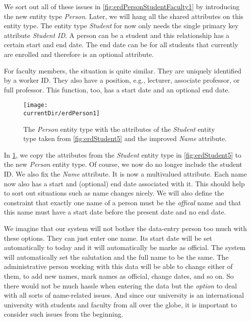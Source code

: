 We sort out all of these issues in \cref{fig:erdPersonStudentFaculty1} by introducing the new entity type \emph{Person}.
Later, we will hang all the shared attributes on this entity type.
The entity type \emph{Student} for now only needs the single primary key attribute \emph{Student ID}.
A person can be a student and this relationship has a certain start and end date.
The end date can be  for all students that currently are enrolled and therefore is an optional attribute.

For faculty members, the situation is quite similar.
They are uniquely identified by a worker ID.
They also have a position, e.g., lecturer, associate professor, or full professor.
This function, too, has a start date and an optional end date.

\begin{figure}%
\centering%
\texttt{[image: \\currentDir/erdPerson1]}%
\caption{The \emph{Person} entity type with the attributes of the \emph{Student} entity type taken from \cref{fig:erdStudent5} and the improved \emph{Name} attribute.}%
\label{fig:erdPerson1}%
\end{figure}%
%
In \cref{fig:erdPerson1}, we copy the attributes from the \emph{Student} entity type in \cref{fig:erdStudent5} to the new \emph{Person} entity type.
Of course, we now do no longer include the student ID.
We also fix the \emph{Name} attribute.
It is now a multivalued attribute.
Each name now also has a start and (optional) end date associated with it.
This should help to sort out situations such as name changes nicely.
We will also define the constraint that exactly one name of a person must be the \emph{offical} name and that this name must have a start date before the present date and no end date.

We imagine that our system will not bother the data-entry person too much with these options.
They can just enter one name.
Its start date will be set automatically to today and it will automatically be marke as official.
The system will automatically set the salutation and the full name to be the same.
The administrative person working with this data will be able to change either of them, to add new names, mark names as official, change dates, and so on.
So there would not be much hassle when entering the data but the \emph{option} to deal with all sorts of name-related issues.
And since our university is an international university with students and faculty from all over the globe, it is important to consider such issues from the beginning.

